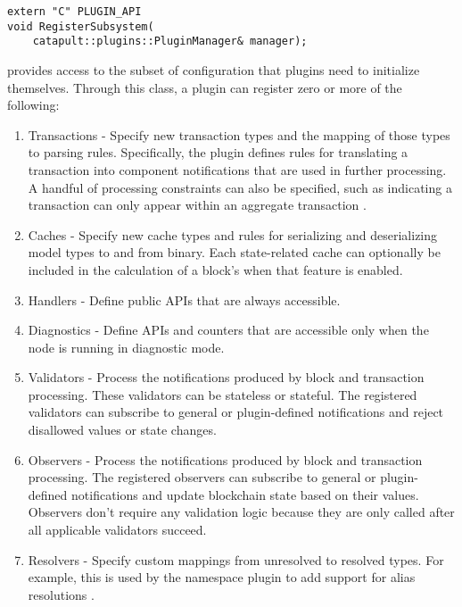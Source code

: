 \begin{lstlisting}
extern "C" PLUGIN_API
void RegisterSubsystem(
	catapult::plugins::PluginManager& manager);
\end{lstlisting}

 provides access to the subset of configuration that plugins need to initialize themselves.
Through this class, a plugin can register zero or more of the following:

\begin{enumerate}
	\item{Transactions -
		Specify new transaction types and the mapping of those types to parsing rules.
		Specifically, the plugin defines rules for translating a transaction into component notifications that are used in further processing.
		A handful of processing constraints can also be specified, such as indicating a transaction can only appear within an aggregate transaction .
	}
	\item{Caches -
		Specify new cache types and rules for serializing and deserializing model types to and from binary.
		Each state-related cache can optionally be included in the calculation of a block's   when that feature is enabled.
	}
	\item{Handlers - Define public APIs that are always accessible.}
	\item{Diagnostics - Define APIs and counters that are accessible only when the node is running in diagnostic mode.}
	\item{Validators - Process the notifications produced by block and transaction processing.
			These validators can be stateless or stateful.
			The registered validators can subscribe to general or plugin-defined notifications and reject disallowed values or state changes.
	}
	\item{Observers - Process the notifications produced by block and transaction processing.
		The registered observers can subscribe to general or plugin-defined notifications and update blockchain state based on their values.
		Observers don't require any validation logic because they are only called after all applicable validators succeed.
	}
	\item{Resolvers -
		Specify custom mappings from unresolved to resolved types.
		For example, this is used by the namespace plugin to add support for alias resolutions
.
	}
\end{enumerate}

